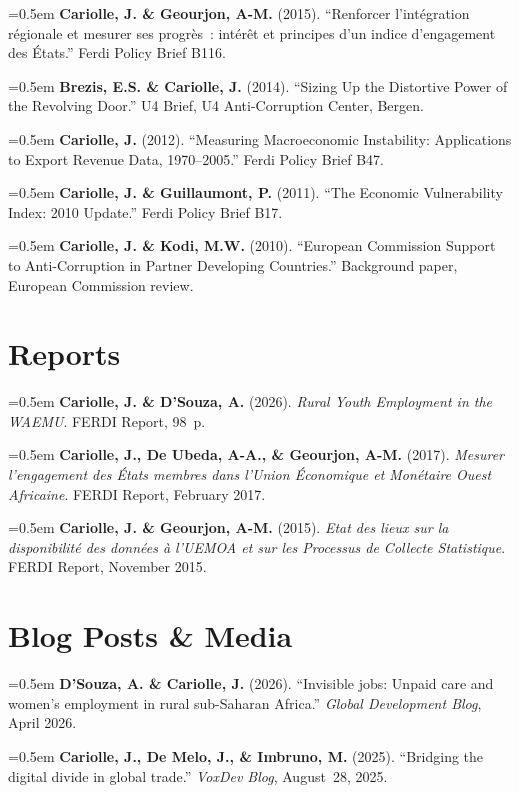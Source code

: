 \documentclass[11pt, a4paper]{article}
\newcommand{\cvpub}[1]{\noindent\hangindent=0.5em\hangafter=1 #1\par\vspace{5pt}}
\begin{document}
\cvpub{\textbf{Cariolle, J. \& Geourjon, A-M.} (2015). ``Renforcer l'int\'{e}gration r\'{e}gionale et mesurer ses progr\`{e}s~: int\'{e}r\^{e}t et principes d'un indice d'engagement des \'{E}tats.'' Ferdi Policy Brief B116.}

\cvpub{\textbf{Brezis, E.S. \& Cariolle, J.} (2014). ``Sizing Up the Distortive Power of the Revolving Door.'' U4 Brief, U4 Anti-Corruption Center, Bergen.}

\cvpub{\textbf{Cariolle, J.} (2012). ``Measuring Macroeconomic Instability: Applications to Export Revenue Data, 1970--2005.'' Ferdi Policy Brief B47.}

\cvpub{\textbf{Cariolle, J. \& Guillaumont, P.} (2011). ``The Economic Vulnerability Index: 2010 Update.'' Ferdi Policy Brief B17.}

\cvpub{\textbf{Cariolle, J. \& Kodi, M.W.} (2010). ``European Commission Support to Anti-Corruption in Partner Developing Countries.'' Background paper, European Commission review.}

\section{Reports}

\cvpub{\textbf{Cariolle, J. \& D'Souza, A.} (2026). \textit{Rural Youth Employment in the WAEMU}. FERDI Report, 98~p.}

\cvpub{\textbf{Cariolle, J., De Ubeda, A-A., \& Geourjon, A-M.} (2017). \textit{Mesurer l'engagement des \'{E}tats membres dans l'Union \'{E}conomique et Mon\'{e}taire Ouest Africaine}. FERDI Report, February 2017.}

\cvpub{\textbf{Cariolle, J. \& Geourjon, A-M.} (2015). \textit{Etat des lieux sur la disponibilit\'{e} des donn\'{e}es \`{a} l'UEMOA et sur les Processus de Collecte Statistique}. FERDI Report, November 2015.}

\section{Blog Posts \& Media}

\cvpub{\textbf{D'Souza, A. \& Cariolle, J.} (2026). ``Invisible jobs: Unpaid care and women's employment in rural sub-Saharan Africa.'' \textit{Global Development Blog}, April 2026.}

\cvpub{\textbf{Cariolle, J., De Melo, J., \& Imbruno, M.} (2025). ``Bridging the digital divide in global trade.'' \textit{VoxDev Blog}, August~28, 2025.}
\end{document}
